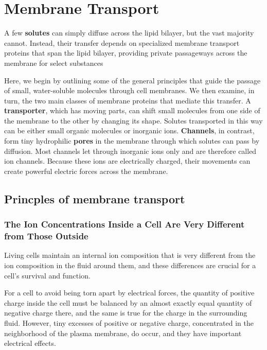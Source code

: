 \chapter{Membrane Transport}

A few \textbf{solutes} can simply diffuse across the lipid bilayer, but
the vast majority cannot. Instead, their transfer depends on specialized
membrane transport proteins that span the lipid bilayer, providing
private passageways across the membrane for select substances

Here, we begin by outlining some of the general principles that guide the passage
of small, water-soluble molecules through cell membranes. We then
examine, in turn, the two main classes of membrane proteins that mediate
this transfer. A \textbf{transporter}, which has moving parts, can shift small
molecules from one side of the membrane to the other by changing its
shape. Solutes transported in this way can be either small organic molecules
or inorganic ions. \textbf{Channels}, in contrast, form tiny hydrophilic \textbf{pores}
in the membrane through which solutes can pass by diffusion. Most channels
let through inorganic ions only and are therefore called ion channels.
Because these ions are electrically charged, their movements can create
powerful electric forces across the membrane.

\section{Princples of membrane transport}

\subsection{The Ion Concentrations Inside a Cell Are Very Different from Those Outside}

Living cells maintain an internal ion composition that is very different
from the ion composition in the fluid around them, and these differences
are crucial for a cell’s survival and function.

For a cell to avoid being torn apart by electrical forces, the quantity of positive charge inside the
cell must be balanced by an almost exactly equal quantity of negative
charge there, and the same is true for the charge in the surrounding fluid.
However, tiny excesses of positive or negative charge, concentrated in
the neighborhood of the plasma membrane, do occur, and they have
important electrical effects.

